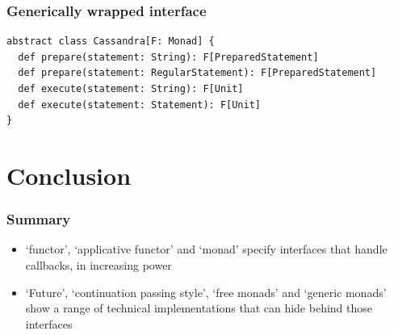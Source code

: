 \documentclass{beamer}
\begin{document}
\begin{frame}[fragile]
\frametitle{Generically wrapped interface}
\begin{lstlisting}
abstract class Cassandra[F: Monad] {
  def prepare(statement: String): F[PreparedStatement]
  def prepare(statement: RegularStatement): F[PreparedStatement]
  def execute(statement: String): F[Unit]
  def execute(statement: Statement): F[Unit]
}
\end{lstlisting}
\end{frame}

\section{Conclusion}

\begin{frame}
\frametitle{Summary}
\begin{itemize}
\item `functor', `applicative functor' and `monad' specify interfaces that handle callbacks, in increasing power
\item `Future', `continuation passing style', `free monads' and `generic monads' show a range of technical implementations that can hide behind those interfaces
\end{itemize}

\end{frame}
\end{document}
